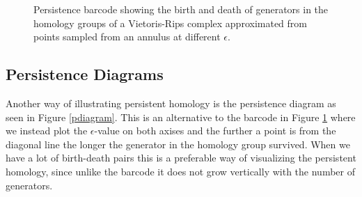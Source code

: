 \begin{figure}
\caption{\label{annulus_barcode} Persistence barcode showing the birth and death of generators in the homology groups of a Vietoris-Rips complex approximated from points sampled from an annulus at different $\epsilon$. }
\end{figure}
  \subsection{Persistence Diagrams}
  Another way of illustrating persistent homology is the persistence diagram as seen in Figure \ref{pdiagram}. This is an alternative to the barcode in Figure \ref{annulus_barcode} where we instead plot the $\epsilon$-value on both axises and the further a point is from the diagonal line the longer the generator in the homology group survived. When we have a lot of birth-death pairs this is a preferable way of visualizing the persistent homology, since unlike the barcode it does not grow vertically with the number of generators.


